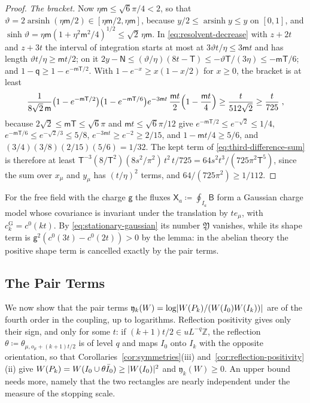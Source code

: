 \documentclass[11pt]{preprint}
\DeclarePairedDelimiter{\abs}{\lvert}{\rvert}
\numberwithin{equation}{section}
\theoremstyle{definition}
\theoremstyle{remark}
\theoremstyle{plain}
\begin{document}
\begin{proof}
\emph{The bracket.} Now $\eta\mathsf m \leq \sqrt6\pi/4 < 2$, so that $\vartheta = 2\operatorname{arsinh}(\eta\mathsf m/2) \in [\eta\mathsf m/2, \eta\mathsf m]$, because $y/2 \leq \operatorname{arsinh}y \leq y$ on $[0, 1]$, and $\sinh\vartheta = \eta\mathsf m(1 + \eta^2\mathsf m^2/4)^{1/2} \leq \sqrt2\,\eta\mathsf m$. In \eqref{eq:resolvent-decrease} with $z + 2t$ and $z + 3t$ the interval of integration starts at most at $3\vartheta t/\eta \leq 3\mathsf mt$ and has length $\vartheta t/\eta \geq \mathsf mt/2$; on it $2y - \mathsf N \leq (\vartheta/\eta)(8t - \mathsf T) \leq -\vartheta\mathsf T/(3\eta) \leq -\mathsf m\mathsf T/6$; and $1 - \mathsf q \geq 1 - e^{-\mathsf m\mathsf T/2}$. With $1 - e^{-x} \geq x(1 - x/2)$ for $x \geq 0$, the bracket is at least
\begin{equation}\label{eq:bracket-lower}
    \frac{1}{8\sqrt2\,\mathsf m}\bigl(1 - e^{-\mathsf m\mathsf T/2}\bigr)\bigl(1 - e^{-\mathsf m\mathsf T/6}\bigr)e^{-3\mathsf mt}\,\frac{\mathsf mt}{2}\Bigl(1 - \frac{\mathsf mt}{4}\Bigr) \geq \frac{t}{512\sqrt2} \geq \frac{t}{725}\;,
\end{equation}
because $2\sqrt2 \leq \mathsf m\mathsf T \leq \sqrt6\pi$ and $\mathsf mt \leq \sqrt6\pi/12$ give $e^{-\mathsf m\mathsf T/2} \leq e^{-\sqrt2} \leq 1/4$, $e^{-\mathsf m\mathsf T/6} \leq e^{-\sqrt2/3} \leq 5/8$, $e^{-3\mathsf mt} \geq e^{-2} \geq 2/15$, and $1 - \mathsf mt/4 \geq 5/6$, and $(3/4)(3/8)(2/15)(5/6) = 1/32$. The kept term of \eqref{eq:third-difference-sum} is therefore at least $\mathsf T^{-3}(8/\mathsf T^2)(8s^2/\pi^2)\,t^2\,t/725 = 64s^2t^3/(725\pi^2\mathsf T^5)$, since the sum over $x_\mu$ and $y_\mu$ has $(t/\eta)^2$ terms, and $64/(725\pi^2) \geq 1/112$.
\end{proof}

For the free field with the charge $\mathsf g$ the fluxes $\mathsf X_a \coloneqq \oint_{I_a}\mathsf B$ form a Gaussian charge model whose covariance is invariant under the translation by $te_\mu$, with $c^{\mathrm G}_k = c^0(kt)$. By \eqref{eq:stationary-gaussian} its number $\mathfrak Y$ vanishes, while its shape term is $\mathsf g^2(c^0(3t) - c^0(2t)) > 0$ by the lemma: in the abelian theory the positive shape term is cancelled exactly by the pair terms.

\subsection{The Pair Terms}\label{sec:pair-terms}

We now show that the pair terms $\mathfrak y_k(W) = \log\abs{W(P_k)/(W(I_0)W(I_k))}$ are of the fourth order in the coupling, up to logarithms. Reflection positivity gives only their sign, and only for some $t$: if $(k + 1)t/2 \in uL^{-q}\mathbb Z$, the reflection $\theta \coloneqq \theta_{\mu,o_\mu+(k+1)t/2}$ is of level $q$ and maps $I_0$ onto $I_k$ with the opposite orientation, so that Corollaries~\ref{cor:symmetries}(iii) and~\ref{cor:reflection-positivity}(ii) give $W(P_k) = W(I_0 \cup \theta\bar I_0) \geq \abs{W(I_0)}^2$ and $\mathfrak y_k(W) \geq 0$. An upper bound needs more, namely that the two rectangles are nearly independent under the measure of the stopping scale.
\end{document}
